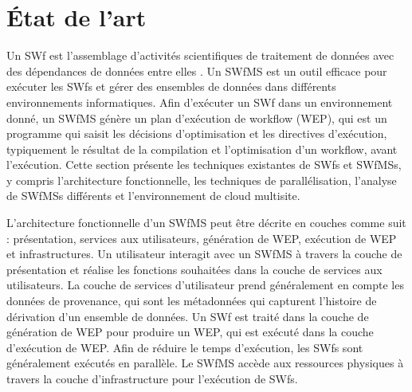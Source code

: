 \section*{État de l'art} 

Un SWf est l'assemblage d'activités scientifiques de traitement de données avec des dépendances de données entre elles \cite{Deelman2009}.
Un SWfMS est un outil efficace pour exécuter les SWfs et gérer des ensembles de données dans différents environnements informatiques.
Afin d'exécuter un SWf dans un environnement donné, un SWfMS génère un plan d'exécution de workflow (WEP), qui est un programme qui saisit les décisions d'optimisation et les directives d'exécution, typiquement le résultat de la compilation et l'optimisation d'un workflow, avant l'exécution.
Cette section présente les techniques existantes de SWfs et SWfMSs, y compris l'architecture fonctionnelle, les techniques de parallélisation, l'analyse de  SWfMSs différents et l'environnement de cloud multisite.

L'architecture fonctionnelle d'un SWfMS peut être décrite en couches comme suit \cite{Deelman2005, Zhao2007, Altintas2004, Ogasawara2013}: présentation, services aux utilisateurs, génération de WEP, exécution de WEP et infrastructures. Un utilisateur interagit avec un SWfMS à travers la couche de présentation et réalise les fonctions souhaitées dans la couche de services aux utilisateurs. La couche de services d'utilisateur prend généralement en compte les données de provenance, qui sont les métadonnées qui capturent l'histoire de dérivation d'un ensemble de données. Un SWf est traité dans la couche de génération de WEP pour produire un WEP, qui est exécuté dans la couche d'exécution de WEP. Afin de réduire le temps d'exécution, les SWfs sont généralement exécutés en parallèle. Le SWfMS accède aux ressources physiques à travers la couche d'infrastructure pour l'exécution de SWfs.

